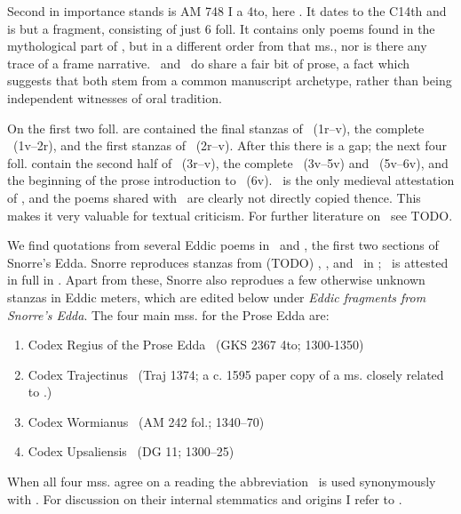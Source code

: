     Second in importance stands is AM 748 I a 4to, here \AM.  It dates to the C14th and is but a fragment, consisting of just 6 foll.  It contains only poems found in the mythological part of \Regius, but in a different order from that ms., nor is there any trace of a frame narrative.  \Regius\ and \AM\ do share a fair bit of prose, a fact which suggests that both stem from a common manuscript archetype, rather than being independent witnesses of oral tradition.

    On the first two foll. are contained the final stanzas of \Harbardsljod\ (1r–v), the complete \Baldrsdraumar\ (1v–2r), and the first stanzas of \Skirnismal\ (2r–v).  After this there is a gap; the next four foll. contain the second half of \Vafthrudnismal\ (3r–v), the complete \Grimnismal\ (3v–5v) and \Hymiskvida\ (5v–6v), and the beginning of the prose introduction to \Volundarkvida\ (6v).  \AM\ is the only medieval attestation of \Baldrsdraumar, and the poems shared with \Regius\ are clearly not directly copied thence.  This makes it very valuable for textual criticism.  For further literature on \AM\ see TODO.


    We find quotations from several Eddic poems in \Gylfaginning\ and \Skaldskaparmal, the first two sections of Snorre’s Edda.  Snorre reproduces stanzas from (TODO) \Voluspa, \Vafthrudnismal, and \Grimnismal\ in \Gylfaginning; \Grottasongr\ is attested in full in \Skaldskaparmal.  Apart from these, Snorre also reprodues a few otherwise unknown stanzas in Eddic meters, which are edited below under \emph{Eddic fragments from Snorre’s Edda}.  The four main mss. for the Prose Edda are:%

    \begin{enumerate}
      \item Codex Regius of the Prose Edda \RegiusProse\ (GKS 2367 4to; 1300-1350)
      \item Codex Trajectinus \Trajectinus\ (Traj 1374; a c. 1595 paper copy of a ms. closely related to \RegiusProse.)
      \item Codex Wormianus \Wormianus\ (AM 242 fol.; 1340–70)
      \item Codex Upsaliensis \Upsaliensis\ (DG 11; 1300–25)
    \end{enumerate}

    When all four mss. agree on a reading the abbreviation \GylfMS\ is used synonymously with \RegiusProse\Trajectinus\Wormianus\Upsaliensis.  For discussion on their internal stemmatics and origins I refer to \textcite{Haukur2017}.


